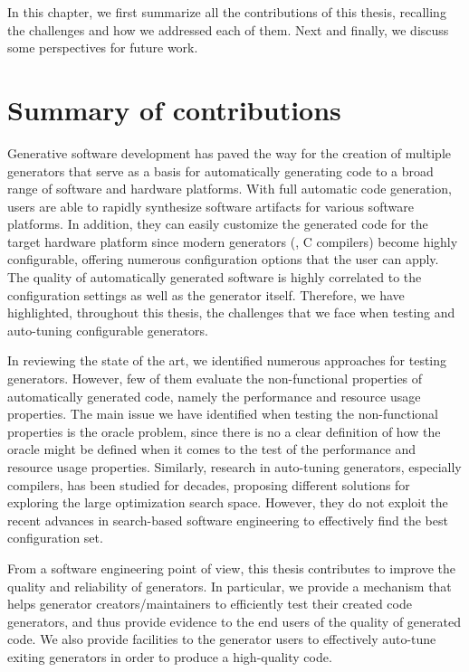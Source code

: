 In this chapter, we first summarize all the contributions of this thesis, recalling the challenges and how we addressed each of them. Next and finally, we discuss some perspectives for future work.

\section{Summary of contributions}
Generative software development has paved the way for the creation of multiple generators that serve as a basis for automatically generating code to a broad range of software and hardware platforms. With full automatic code generation, users are able to rapidly synthesize software artifacts for various software platforms. In addition, they can easily customize the generated code for the target hardware platform since modern generators (\ie, C compilers) become highly configurable, offering numerous configuration options that the user can apply. 
The quality of automatically generated software is highly correlated to the configuration settings as well as the generator itself.
Therefore, we have highlighted, throughout this thesis, the challenges that we face when testing and auto-tuning configurable generators. 

In reviewing the state of the art, we identified numerous approaches for testing generators. However, few of them evaluate the non-functional properties of automatically generated code, namely the performance and resource usage properties. The main issue we have identified when testing the non-functional properties is the oracle problem, since there is no a clear definition of how the oracle might be defined when it comes to the test of the performance and resource usage properties. Similarly, research in auto-tuning generators, especially compilers, has been studied for decades, proposing different solutions for exploring the large optimization search space. However, they  do not exploit the recent advances in search-based software engineering to effectively find the best configuration set. 
 

From a software engineering point of view, this thesis contributes to improve the quality and reliability of generators. In particular, we provide a mechanism that helps generator creators/maintainers to efficiently test their created code generators, and thus provide evidence to the end users of the quality of generated code. We also provide facilities to the generator users to effectively auto-tune exiting generators in order to produce a high-quality code.

